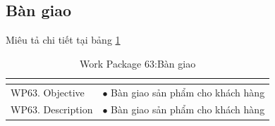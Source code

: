 \documentclass[a4paper]{book}
\begin{document}
\subsection{Bàn giao} Miêu tả chi tiết tại bảng \ref{table:bangiao}
\begin{table}[h!]
	\begin{center}
		\begin{tabular}{|p{4cm}|p{10cm}|}
			\hline
			\multicolumn{2}{|c|}{\cellcolor[HTML]{363636}{\color[HTML]{FFFFFF}Work package 63: Bàn giao}}\\
			\hline
			\multirow{1}{*}{WP63. Objective} & $\bullet$ Bàn giao sản phẩm cho khách hàng\\
			\hline
			\multirow{1}{*}{WP63. Description} & $\bullet$ Bàn giao sản phẩm cho khách hàng \\
			\hline
		\end{tabular}
		\caption{Work Package 63:Bàn giao}
		\label{table:bangiao}
	\end{center}
\end{table}
\end{document}
